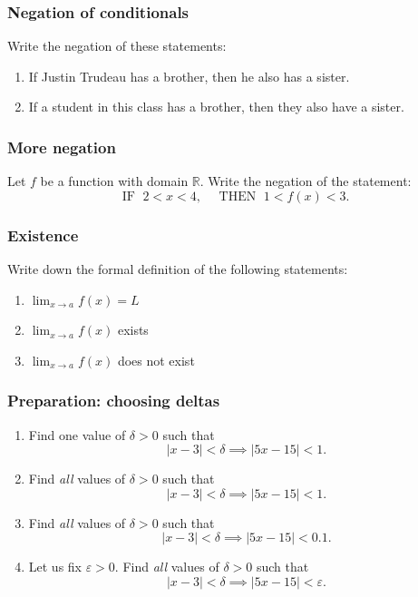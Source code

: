 \documentclass[14pt]{beamer}
\newcommand {\DS} [1] {${\displaystyle #1}$}
\newcommand{\e}{\varepsilon}
\begin{document}

\begin{frame}
\frametitle{Negation of conditionals}

Write the negation of these statements:
	\begin{enumerate}
		\item  If Justin Trudeau has a brother, then he also has a sister.
		\item  If a student in this class has a brother, then they also have a sister.
	\end{enumerate}	
\end{frame}

\begin{frame}
\frametitle{More negation}

Let $f$ be a function with domain $\mathbb{R}$.  Write the negation of the statement:
	\begin{equation*}
		\mbox{IF } \; 2<x<4, \quad \mbox{ THEN } \; 1<f(x)<3.  	
	\end{equation*}


\end{frame}

\begin{frame}
\frametitle{Existence}

Write down the formal definition of the following statements:

\vfill
\begin{enumerate}

\item  \DS{\lim_{x \to a} f(x) = L}
\vfill

\item  \DS{\lim_{x \to a} f(x) } exists

\vfill
\item  \DS{\lim_{x \to a} f(x) } does not exist

\end{enumerate}

\vfill

\end{frame}

\begin{frame}[t]
\frametitle{Preparation: choosing deltas}

\begin{enumerate}
	\item  Find one value of $\delta >0$ such that  
		$$ |x-3|< \delta \implies |5x-15|<1.$$
	\item  Find \emph{all} values of $\delta >0$ such that  
		$$ |x-3|< \delta \implies |5x-15|<1. $$
	\item  Find \emph{all} values of $\delta >0$ such that  
		$$|x-3|< \delta \implies |5x-15|<0.1. $$
	\item  Let us fix $\e >0$.  Find \emph{all} values of $\delta >0$ such that  
		$$|x-3|< \delta \implies |5x-15|<\e.$$
\end{enumerate}

\end{frame}
\end{document}
